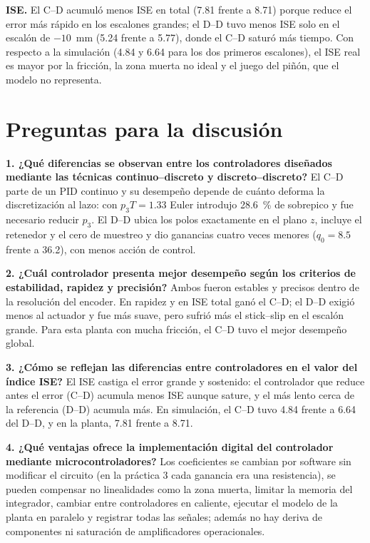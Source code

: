 \documentclass[conference]{IEEEtran}
\begin{document}
\textbf{ISE.} El C--D acumuló menos ISE en total (7.81 frente a 8.71)
porque reduce el error más rápido en los escalones grandes; el D--D tuvo menos
ISE solo en el escalón de $-10$~mm (5.24 frente a 5.77), donde el C--D saturó
más tiempo. Con respecto a la simulación (4.84 y 6.64 para los dos primeros
escalones), el ISE real es mayor por la fricción, la zona muerta no ideal y el
juego del piñón, que el modelo no representa.

\section{Preguntas para la discusión}

\textbf{1. ¿Qué diferencias se observan entre los controladores diseñados
mediante las técnicas continuo--discreto y discreto--discreto?} El C--D parte
de un PID continuo y su desempeño depende de cuánto deforma la discretización
al lazo: con $p_3T = 1.33$ Euler introdujo 28.6~\% de sobrepico y fue
necesario reducir $p_3$. El D--D ubica los polos exactamente en el plano $z$,
incluye el retenedor y el cero de muestreo y dio ganancias cuatro veces
menores ($q_0 = 8.5$ frente a 36.2), con menos acción de control.

\textbf{2. ¿Cuál controlador presenta mejor desempeño según los criterios de
estabilidad, rapidez y precisión?} Ambos fueron estables y precisos dentro de
la resolución del encoder. En rapidez y en ISE total ganó el C--D; el D--D
exigió menos al actuador y fue más suave, pero sufrió más el stick--slip en el
escalón grande. Para esta planta con mucha fricción, el C--D tuvo el mejor
desempeño global.

\textbf{3. ¿Cómo se reflejan las diferencias entre controladores en el valor
del índice ISE?} El ISE castiga el error grande y sostenido: el controlador que
reduce antes el error (C--D) acumula menos ISE aunque sature, y el más lento
cerca de la referencia (D--D) acumula más. En simulación, el C--D tuvo
4.84 frente a 6.64 del D--D, y en la planta, 7.81 frente a 8.71.

\textbf{4. ¿Qué ventajas ofrece la implementación digital del controlador
mediante microcontroladores?} Los coeficientes se cambian por software sin
modificar el circuito (en la práctica 3 cada ganancia era una resistencia), se
pueden compensar no linealidades como la zona muerta, limitar la memoria del
integrador, cambiar entre controladores en caliente, ejecutar el modelo de la
planta en paralelo y registrar todas las señales; además no hay deriva de
componentes ni saturación de amplificadores operacionales.
\end{document}
